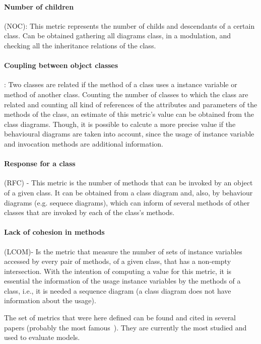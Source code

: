 \paragraph{Number of children} (NOC): This metric represents the number of childs and descendants of a certain class. Can be obtained gathering all diagrams class, in a \umlS modulation, and checking all the inheritance relations of the class.

\paragraph{Coupling between object classes}: Two classes are related if the method of a class uses a instance variable or method of another class. Counting the number of classes to which the class are related and counting all kind of references of the attributes and parameters of the methods of the class, an estimate of this metric's value can be obtained from the class diagrams. Though, it is possible to calcute a more precise value if the behavioural diagrams are taken into account, since the usage of instance variable and invocation methods are additional information.

\paragraph{Response for a class} (RFC) - This metric is the number of methods that can be invoked by an object of a given class. It can be obtained from a class diagram and, also, by behaviour diagrams (e.g. sequece diagrams), which can inform of several methods of other classes that are invoked by each of the class's methods.

\paragraph{Lack of cohesion in methods} (LCOM)- Is the metric that measure the number of sets of instance variables accessed by every pair of methods, of a given class, that has a non-empty intersection. With the intention of computing a value for this metric, it is essential the information of the usage instance variables by the methods of a class, i.e., it is needed a sequence diagram (a class diagram does not have information about the usage).

The set of metrics that were here defined can be found and cited in several papers (probably the most famous~\cite{Power2}). They are currently the most studied and used to evaluate \uml models.\\

